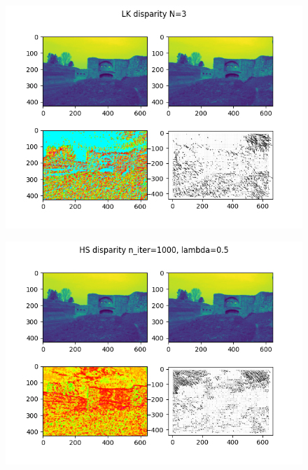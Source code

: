 \documentclass[9pt]{IEEEtran}
\begin{document}
\begin{figure}[h]
    \centering
    \includegraphics[width=1\columnwidth]{disparitylk.png}
    \label{fig:collisionlk}
\end{figure}
\begin{figure}[h]
    \centering
    \includegraphics[width=1\columnwidth]{disparityhs.png}
    \label{fig:collisionhs}
\end{figure}
\end{document}
